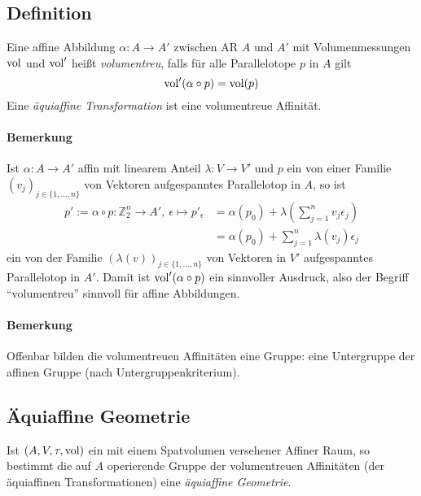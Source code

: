\subsection{Definition}
	\begin{Definition}
		Eine affine Abbildung $ \alpha:A\to A' $ zwischen AR $ A $ und $ A' $ mit Volumenmessungen $ \operatorname{vol} $ und $ \operatorname{vol}' $ heißt \emph{volumentreu}, falls für alle Parallelotope $ p $ in $ A $ gilt
			\[ \operatorname{vol}'(\alpha\circ p)=\operatorname{vol}(p) \]
		Eine \emph{äquiaffine Transformation} ist eine volumentreue Affinität.
	\end{Definition}
\paragraph{Bemerkung}
	Ist $ \alpha:A\to A' $ affin mit linearem Anteil $ \lambda:V \to V' $ und $ p $ ein von einer Familie $ (v_j)_{j\in\{1,\dots,n\}} $ von Vektoren aufgespanntes Parallelotop in $ A $, so ist
	 \begin{align*}
	 p':= \alpha\circ p:\mathbb{Z}_2^n\to A',\ \epsilon \mapsto p'_\epsilon &= \alpha(p_0)+\lambda(\sum_{j=1}^{n}v_j\epsilon_j)\\
	 &= \alpha(p_0)+\sum_{j=1}^{n}\lambda(v_j)\epsilon_j
	 \end{align*}
	ein von der Familie $ (\lambda(v))_{j\in \{1,\dots,n\}} $ von Vektoren in $ V' $ aufgespanntes Parallelotop in $ A' $. Damit ist $ \operatorname{vol}'(\alpha\circ p) $ ein sinnvoller Ausdruck, also der Begriff "`volumentreu"' sinnvoll für affine Abbildungen.
\paragraph{Bemerkung}
	Offenbar bilden die volumentreuen Affinitäten eine Gruppe: eine Untergruppe der affinen Gruppe (nach Untergruppenkriterium).
\subsection{Äquiaffine Geometrie}
	\begin{Definition}
	Ist $ (A,V,\tau,\operatorname{vol}) $ ein mit einem Spatvolumen versehener Affiner Raum, so bestimmt die auf $ A $ operierende Gruppe der volumentreuen Affinitäten (der äquiaffinen Transformationen) eine \emph{äquiaffine Geometrie}.
	\end{Definition}

